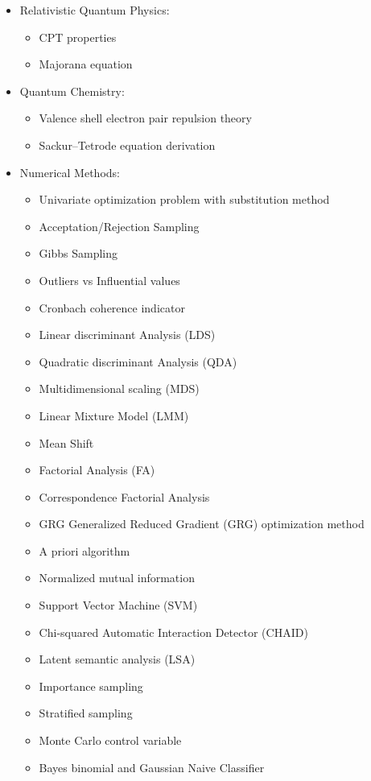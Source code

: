 \begin{itemize}
		\item Relativistic Quantum Physics:
			\begin{itemize}
				\item CPT properties
				\item Majorana equation
			\end{itemize}
		\item Quantum Chemistry:
			\begin{itemize}
				\item Valence shell electron pair repulsion theory
				\item Sackur–Tetrode equation derivation
			\end{itemize}
		\item Numerical Methods: 
			\begin{itemize}
				\item Univariate optimization problem with substitution method					
				\item Acceptation/Rejection Sampling
				\item Gibbs Sampling				
				\item Outliers vs Influential values
				\item Cronbach coherence indicator
				\item Linear discriminant Analysis (LDS)
				\item Quadratic discriminant Analysis (QDA)
				\item Multidimensional scaling (MDS)
				\item Linear Mixture Model (LMM)
				\item Mean Shift
				\item Factorial Analysis (FA)
				\item Correspondence Factorial Analysis
				\item GRG Generalized Reduced Gradient (GRG) optimization method
				\item A priori algorithm
				\item Normalized mutual information
				\item Support Vector Machine (SVM)
				\item Chi-squared Automatic Interaction Detector (CHAID)
				\item Latent semantic analysis (LSA)
				\item Importance sampling
				\item Stratified sampling
				\item Monte Carlo control variable
				\item Bayes binomial and Gaussian Naive Classifier

\end{itemize}
\end{itemize}
